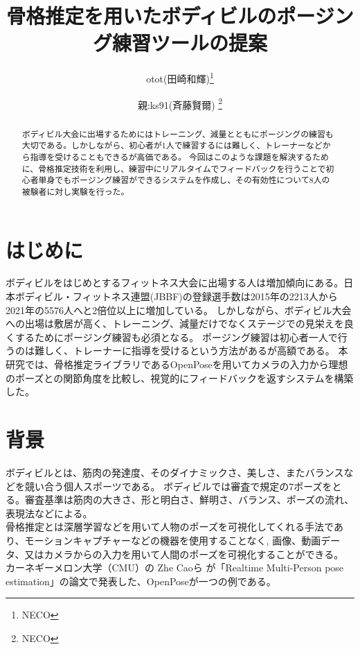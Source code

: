 \documentclass[a4j,10pt]{jsarticle}
\begin{document}

\title{骨格推定を用いたボディビルのポージング練習ツールの提案}

\author{
    otot(田崎和輝)\thanks{NECO}
    \and
    親:ks91(斉藤賢爾) \thanks{NECO}
}

\begin{abstract}
ボディビル大会に出場するためにはトレーニング、減量とともにポージングの練習も大切である。しかしながら、初心者が1人で練習するには難しく、トレーナーなどから指導を受けることもできるが高価である。
今回はこのような課題を解決するために、骨格推定技術を利用し、練習中にリアルタイムでフィードバックを行うことで初心者単身でもポージング練習ができるシステムを作成し、その有効性について8人の被験者に対し実験を行った。

\end{abstract}

\maketitle

\section{はじめに}
ボディビルをはじめとするフィットネス大会に出場する人は増加傾向にある。日本ボディビル・フィットネス連盟(JBBF)の登録選手数は2015年の2213人から2021年の5576人へと2倍位以上に増加している\cite{jbbf}。
しかしながら、ボディビル大会への出場は敷居が高く、トレーニング、減量だけでなくステージでの見栄えを良くするためにポージング練習も必須となる。
ポージング練習は初心者一人で行うのは難しく、トレーナーに指導を受けるという方法があるが高額である。
本研究では、骨格推定ライブラリであるOpenPoseを用いてカメラの入力から理想のポーズとの関節角度を比較し、視覚的にフィードバックを返すシステムを構築した。
\section{背景}
ボディビルとは、筋肉の発達度、そのダイナミックさ、美しさ、またバランスなどを競い合う個人スポーツである。\cite{bodybuilding}
ボディビルでは審査で規定の7ポーズをとる。審査基準は筋肉の大きさ、形と明白さ、鮮明さ、バランス、ポーズの流れ、表現法などによる。\\
骨格推定とは深層学習などを用いて人物のポーズを可視化してくれる手法であり、モーションキャプチャーなどの機器を使用することなく,
画像、動画データ、又はカメラからの入力を用いて人間のポーズを可視化することができる。
カーネギーメロン大学（CMU）の Zhe Caoら が「Realtime Multi-Person pose estimation」\cite{openpose}の論文で発表した、OpenPoseが一つの例である。
\end{document}
